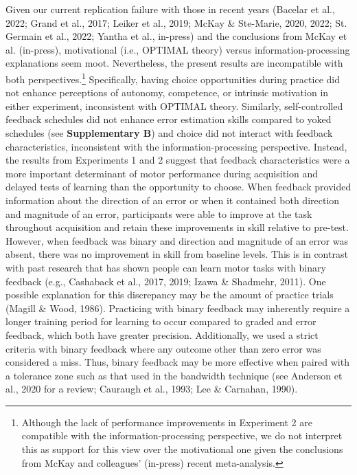 \documentclass[
  doc, donotrepeattitle,floatsintext]{apa7}
\begin{document}
Given our current replication failure with those in recent years (Bacelar et al., 2022; Grand et al., 2017; Leiker et al., 2019; McKay \& Ste-Marie, 2020, 2022; St. Germain et al., 2022; Yantha et al., in-press) and the conclusions from McKay et al. (in-press), motivational (i.e., OPTIMAL theory) versus information-processing explanations seem moot. Nevertheless, the present results are incompatible with both perspectives.\footnote{Although the lack of performance improvements in Experiment 2 are compatible with the information-processing perspective, we do not interpret this as support for this view over the motivational one given the conclusions from McKay and colleagues' (in-press) recent meta-analysis.} Specifically, having choice opportunities during practice did not enhance perceptions of autonomy, competence, or intrinsic motivation in either experiment, inconsistent with OPTIMAL theory. Similarly, self-controlled feedback schedules did not enhance error estimation skills compared to yoked schedules (see \textbf{Supplementary B}) and choice did not interact with feedback characteristics, inconsistent with the information-processing perspective. Instead, the results from Experiments 1 and 2 suggest that feedback characteristics were a more important determinant of motor performance during acquisition and delayed tests of learning than the opportunity to choose. When feedback provided information about the direction of an error or when it contained both direction and magnitude of an error, participants were able to improve at the task throughout acquisition and retain these improvements in skill relative to pre-test. However, when feedback was binary and direction and magnitude of an error was absent, there was no improvement in skill from baseline levels. This is in contrast with past research that has shown people can learn motor tasks with binary feedback (e.g., Cashaback et al., 2017, 2019; Izawa \& Shadmehr, 2011). One possible explanation for this discrepancy may be the amount of practice trials (Magill \& Wood, 1986). Practicing with binary feedback may inherently require a longer training period for learning to occur compared to graded and error feedback, which both have greater precision. Additionally, we used a strict criteria with binary feedback where any outcome other than zero error was considered a miss. Thus, binary feedback may be more effective when paired with a tolerance zone such as that used in the bandwidth technique (see Anderson et al., 2020 for a review; Cauraugh et al., 1993; Lee \& Carnahan, 1990).
\end{document}
